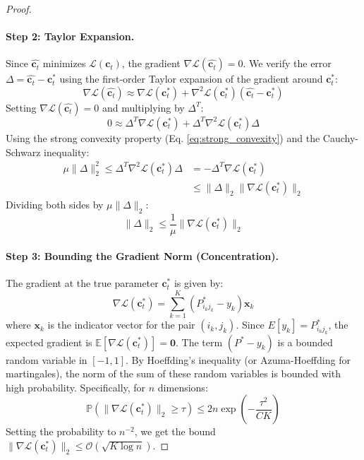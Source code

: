 \documentclass[11pt]{article}
\begin{document}
\begin{proof}
\paragraph{Step 2: Taylor Expansion.}
Since $\hat{\mathbf{c}_t}$ minimizes $\mathcal{L}(\mathbf{c}_t)$, the gradient $\nabla \mathcal{L}(\hat{\mathbf{c}_t}) = 0$. We verify the error $\Delta = \hat{\mathbf{c}_t} - \mathbf{c}_t^*$ using the first-order Taylor expansion of the gradient around $\mathbf{c}_t^*$:
\begin{equation}
    \nabla \mathcal{L}(\hat{\mathbf{c}_t}) \approx \nabla \mathcal{L}(\mathbf{c}_t^*) + \nabla^2 \mathcal{L}(\mathbf{c}_t^*) (\hat{\mathbf{c}_t} - \mathbf{c}_t^*)
\end{equation}
Setting $\nabla \mathcal{L}(\hat{\mathbf{c}_t}) = 0$ and multiplying by $\Delta^T$:
\begin{equation}
    0 \approx \Delta^T \nabla \mathcal{L}(\mathbf{c}_t^*) + \Delta^T \nabla^2 \mathcal{L}(\mathbf{c}_t^*) \Delta
\end{equation}
Using the strong convexity property (Eq. \ref{eq:strong_convexity}) and the Cauchy-Schwarz inequality:
\begin{equation}
\begin{split}
    \mu \|\Delta\|_2^2 \le \Delta^T \nabla^2 \mathcal{L}(\mathbf{c}_t^*) \Delta 
    & = - \Delta^T \nabla \mathcal{L}(\mathbf{c}_t^*) \\
    & \le \|\Delta\|_2 \|\nabla \mathcal{L}(\mathbf{c}_t^*)\|_2
\end{split}
\end{equation}
Dividing both sides by $\mu \|\Delta\|_2$:
\begin{equation}
    \|\Delta\|_2 \le \frac{1}{\mu} \|\nabla \mathcal{L}(\mathbf{c}_t^*)\|_2
    \label{eq:error_bound_raw}
\end{equation}

\paragraph{Step 3: Bounding the Gradient Norm (Concentration).}
The gradient at the true parameter $\mathbf{c}_t^*$ is given by:
\begin{equation}
    \nabla \mathcal{L}(\mathbf{c}_t^*) = \sum_{k=1}^K (P_{i_k j_k}^* - y_k) \mathbf{x}_k
\end{equation}
where $\mathbf{x}_k$ is the indicator vector for the pair $(i_k, j_k)$. Since $E[y_k] = P_{i_k j_k}^*$, the expected gradient is $\mathbb{E}[\nabla \mathcal{L}(\mathbf{c}_t^*)] = \mathbf{0}$.
The term $(P^* - y_k)$ is a bounded random variable in $[-1, 1]$. By Hoeffding's inequality (or Azuma-Hoeffding for martingales), the norm of the sum of these random variables is bounded with high probability. Specifically, for $n$ dimensions:
\begin{equation}
    \mathbb{P}\left( \|\nabla \mathcal{L}(\mathbf{c}_t^*)\|_2 \ge \tau \right) \le 2n \exp\left( - \frac{\tau^2}{C K} \right)
\end{equation}
Setting the probability to $n^{-2}$, we get the bound $\|\nabla \mathcal{L}(\mathbf{c}_t^*)\|_2 \le \mathcal{O}(\sqrt{K \log n})$.


\end{proof}
\end{document}

